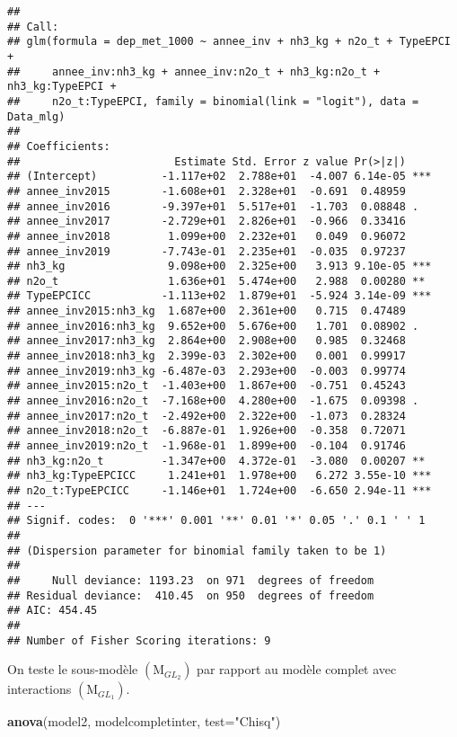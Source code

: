 \documentclass[
]{article}
\newenvironment{Shaded}{\begin{snugshade}}{\end{snugshade}}
\newcommand{\AttributeTok}[1]{\textcolor[rgb]{0.13,0.29,0.53}{#1}}
\newcommand{\FunctionTok}[1]{\textcolor[rgb]{0.13,0.29,0.53}{\textbf{#1}}}
\newcommand{\NormalTok}[1]{#1}
\newcommand{\StringTok}[1]{\textcolor[rgb]{0.31,0.60,0.02}{#1}}
\begin{document}
\begin{verbatim}
## 
## Call:
## glm(formula = dep_met_1000 ~ annee_inv + nh3_kg + n2o_t + TypeEPCI + 
##     annee_inv:nh3_kg + annee_inv:n2o_t + nh3_kg:n2o_t + nh3_kg:TypeEPCI + 
##     n2o_t:TypeEPCI, family = binomial(link = "logit"), data = Data_mlg)
## 
## Coefficients:
##                        Estimate Std. Error z value Pr(>|z|)    
## (Intercept)          -1.117e+02  2.788e+01  -4.007 6.14e-05 ***
## annee_inv2015        -1.608e+01  2.328e+01  -0.691  0.48959    
## annee_inv2016        -9.397e+01  5.517e+01  -1.703  0.08848 .  
## annee_inv2017        -2.729e+01  2.826e+01  -0.966  0.33416    
## annee_inv2018         1.099e+00  2.232e+01   0.049  0.96072    
## annee_inv2019        -7.743e-01  2.235e+01  -0.035  0.97237    
## nh3_kg                9.098e+00  2.325e+00   3.913 9.10e-05 ***
## n2o_t                 1.636e+01  5.474e+00   2.988  0.00280 ** 
## TypeEPCICC           -1.113e+02  1.879e+01  -5.924 3.14e-09 ***
## annee_inv2015:nh3_kg  1.687e+00  2.361e+00   0.715  0.47489    
## annee_inv2016:nh3_kg  9.652e+00  5.676e+00   1.701  0.08902 .  
## annee_inv2017:nh3_kg  2.864e+00  2.908e+00   0.985  0.32468    
## annee_inv2018:nh3_kg  2.399e-03  2.302e+00   0.001  0.99917    
## annee_inv2019:nh3_kg -6.487e-03  2.293e+00  -0.003  0.99774    
## annee_inv2015:n2o_t  -1.403e+00  1.867e+00  -0.751  0.45243    
## annee_inv2016:n2o_t  -7.168e+00  4.280e+00  -1.675  0.09398 .  
## annee_inv2017:n2o_t  -2.492e+00  2.322e+00  -1.073  0.28324    
## annee_inv2018:n2o_t  -6.887e-01  1.926e+00  -0.358  0.72071    
## annee_inv2019:n2o_t  -1.968e-01  1.899e+00  -0.104  0.91746    
## nh3_kg:n2o_t         -1.347e+00  4.372e-01  -3.080  0.00207 ** 
## nh3_kg:TypeEPCICC     1.241e+01  1.978e+00   6.272 3.55e-10 ***
## n2o_t:TypeEPCICC     -1.146e+01  1.724e+00  -6.650 2.94e-11 ***
## ---
## Signif. codes:  0 '***' 0.001 '**' 0.01 '*' 0.05 '.' 0.1 ' ' 1
## 
## (Dispersion parameter for binomial family taken to be 1)
## 
##     Null deviance: 1193.23  on 971  degrees of freedom
## Residual deviance:  410.45  on 950  degrees of freedom
## AIC: 454.45
## 
## Number of Fisher Scoring iterations: 9
\end{verbatim}

On teste le sous-modèle \((\text{M}_{GL_{2}})\) par rapport au modèle
complet avec interactions \((\text{M}_{GL_{1}})\).

\begin{Shaded}
\begin{Highlighting}[]
\FunctionTok{anova}\NormalTok{(model2, modelcompletinter, }\AttributeTok{test=}\StringTok{"Chisq"}\NormalTok{)}
\end{Highlighting}
\end{Shaded}
\end{document}
